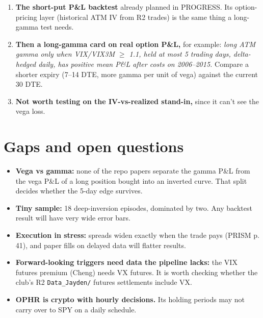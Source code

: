 \documentclass{article}
\begin{document}
\begin{itemize}
\begin{enumerate}

\item \textbf{The short-put P\&L backtest} already planned in PROGRESS. Its option-pricing layer (historical ATM IV from R2 trades) is the same thing a long-gamma test needs.

\item \textbf{Then a long-gamma card on real option P\&L,} for example: \emph{long ATM gamma only when VIX/\allowbreak{}VIX3M \ensuremath{\geq} 1.1, held at most 5 trading days, delta-hedged daily, has positive mean P\&L after costs on 2006--2015.} Compare a shorter expiry (7--14 DTE, more gamma per unit of vega) against the current 30 DTE.

\item \textbf{Not worth testing on the IV-vs-realized stand-in,} since it can't see the vega loss.

\end{enumerate}

\end{itemize}

\section{Gaps and open questions}

\begin{itemize}

\item \textbf{Vega vs gamma:} none of the repo papers separate the gamma P\&L from the vega P\&L of a long position bought into an inverted curve. That split decides whether the 5-day edge survives.

\item \textbf{Tiny sample:} 18 deep-inversion episodes, dominated by two. Any backtest result will have very wide error bars.

\item \textbf{Execution in stress:} spreads widen exactly when the trade pays (PRISM p. 41), and paper fills on delayed data will flatter results.

\item \textbf{Forward-looking triggers need data the pipeline lacks:} the VIX futures premium (Cheng) needs VX futures. It is worth checking whether the club's R2 \texttt{Data\_\allowbreak{}Jayden/\allowbreak{}} futures settlements include VX.

\item \textbf{OPHR is crypto with hourly decisions.} Its holding periods may not carry over to SPY on a daily schedule.

\end{itemize}
\end{document}

